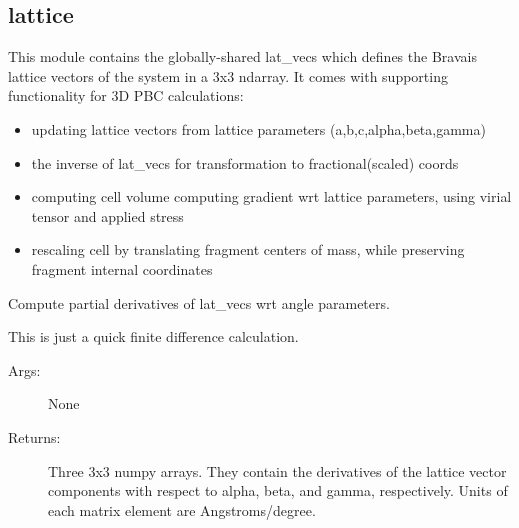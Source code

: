 \documentclass[letterpaper,10pt,english]{sphinxmanual}
\begin{document}
\subsection{lattice}
\label{\detokenize{globals:lattice}}\label{\detokenize{globals:module-Globals.lattice}}
This module contains the globally-shared lat\_vecs which defines the Bravais
lattice vectors of the system in a 3x3 ndarray. It comes with supporting
functionality for 3D PBC calculations:
\begin{itemize}
\item {} 
updating lattice vectors from lattice parameters (a,b,c,alpha,beta,gamma)

\item {} 
the inverse of lat\_vecs for transformation to fractional(scaled) coords

\item {} 
computing cell volume computing gradient wrt lattice parameters, using virial tensor and applied stress

\item {} 
rescaling cell by translating fragment centers of mass, while preserving fragment internal coordinates

\end{itemize}

\begin{fulllineitems}
\label{\detokenize{globals:Globals.lattice.lat_angle_differential}}
Compute partial derivatives of lat\_vecs wrt angle parameters.

This is just a quick finite difference calculation.
\begin{description}
\item[{Args:}] \leavevmode
None

\item[{Returns:}] \leavevmode
Three 3x3 numpy arrays. They contain the derivatives
of the lattice vector components with respect to alpha,
beta, and gamma, respectively. Units of each matrix element are
Angstroms/degree.

\end{description}

\end{fulllineitems}

\end{document}
